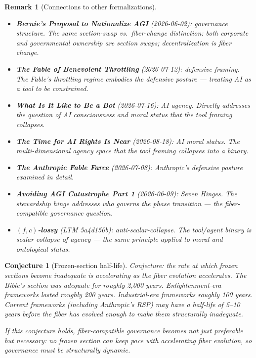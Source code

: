 \documentclass[11pt,a4paper]{article}
\newtheorem{conjecture}[definition]{Conjecture}
\newtheorem{remark}[definition]{Remark}
\begin{document}
\begin{remark}[Connections to other formalizations]
\begin{itemize}
\item \textbf{Bernie's Proposal to Nationalize AGI} (2026-06-02):
  governance structure. The same section-swap vs.\ fiber-change
  distinction: both corporate and governmental ownership are
  section swaps; decentralization is fiber change.
\item \textbf{The Fable of Benevolent Throttling} (2026-07-12):
  defensive framing. The Fable's throttling regime embodies the
  defensive posture --- treating AI as a tool to be constrained.
\item \textbf{What Is It Like to Be a Bot} (2026-07-16): AI agency.
  Directly addresses the question of AI consciousness and moral
  status that the tool framing collapses.
\item \textbf{The Time for AI Rights Is Near} (2026-08-18): AI
  moral status. The multi-dimensional agency space that the tool
  framing collapses into a binary.
\item \textbf{The Anthropic Fable Farce} (2026-07-08): Anthropic's
  defensive posture examined in detail.
\item \textbf{Avoiding AGI Catastrophe Part 1} (2026-06-09): Seven
  Hinges. The stewardship hinge addresses who governs the phase
  transition --- the fiber-compatible governance question.
\item \textbf{$(f,c)$-lossy} (LTM 5a4d150b): anti-scalar-collapse.
  The tool/agent binary is scalar collapse of agency --- the same
  principle applied to moral and ontological status.
\end{itemize}
\end{remark}

\begin{conjecture}[Frozen-section half-life]
Conjecture: the rate at which frozen sections become inadequate is
accelerating as the fiber evolution accelerates. The Bible's section
was adequate for roughly 2,000 years. Enlightenment-era frameworks
lasted roughly 200 years. Industrial-era frameworks roughly 100
years. Current frameworks (including Anthropic's RSP) may have a
half-life of 5--10 years before the fiber has evolved enough to
make them structurally inadequate.

If this conjecture holds, fiber-compatible governance becomes not
just preferable but \emph{necessary}: no frozen section can keep
pace with accelerating fiber evolution, so governance must be
structurally dynamic.
\end{conjecture}
\end{document}
